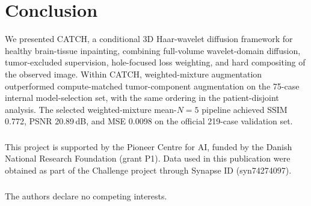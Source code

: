 \documentclass[runningheads]{llncs}
\begin{document}
\section{Conclusion} \label{sec:conclusion}

We presented CATCH, a conditional 3D Haar-wavelet diffusion framework for healthy brain-tissue inpainting, combining full-volume wavelet-domain diffusion, tumor-excluded supervision, hole-focused loss weighting, and hard compositing of the observed image. Within CATCH, weighted-mixture augmentation outperformed compute-matched tumor-component augmentation on the 75-case internal model-selection set, with the same ordering in the patient-disjoint analysis. The selected weighted-mixture mean-$N=5$ pipeline achieved SSIM 0.772, PSNR 20.89\,dB, and MSE 0.0098 on the official 219-case validation set.

\begin{credits}
\subsubsection{\ackname}
This project is supported by the Pioneer Centre for AI, funded by the Danish National Research Foundation (grant P1).
Data used in this publication were obtained as part of the Challenge project through Synapse ID (syn74274097).

\subsubsection{\discintname}
The authors declare no competing interests.
\end{credits}




\end{document}
